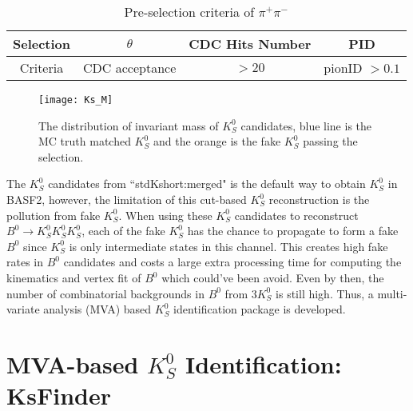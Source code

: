  
 \begin{table}[htbp]
 	\centering
 	\large
 	\caption{Pre-selection criteria of $\pi^+ \pi^-$}
 	\begin{tabular}{c c c c }
 		\toprule
 		Selection & $\theta$ & CDC Hits Number & PID  \\
 		\hline
 		Criteria  & CDC acceptance &  $>20$ & pionID $> 0.1$\\
 		\bottomrule
 	\end{tabular}
 \end{table}


\begin{figure}[htpb]
	\centering 
	\texttt{[image: Ks\_M]}
	\caption{The distribution of invariant mass of $K_S^0$ candidates, blue line is the MC truth matched $K_S^0$ and the orange is the fake $K_S^0$ passing the selection.}
\end{figure}
The $K_S^0$ candidates from ``stdKshort:merged" is the default way to obtain $K_S^0$ in BASF2, 
however, the limitation of this cut-based $K_S^0$ reconstruction is the pollution from fake $K_S^0$. When using these $K_S^0$ candidates to reconstruct $B^0 \to K_S^0  K_S^0  K_S^0$, each of the fake $K_S^0$ has the chance to propagate to form a fake $B^0$ since $K_S^0$ is only intermediate states in this channel. This creates high fake rates in $B^0$ candidates and costs a large extra processing time for computing the kinematics and vertex fit of $B^0$ which could've been avoid. Even by then, the number of combinatorial backgrounds in $B^0$ from 3$K_S^0$ is still high. Thus, a multi-variate analysis (MVA) based $K_S^0$ identification package is developed.

\section{MVA-based $K_S^0$ Identification: KsFinder}

